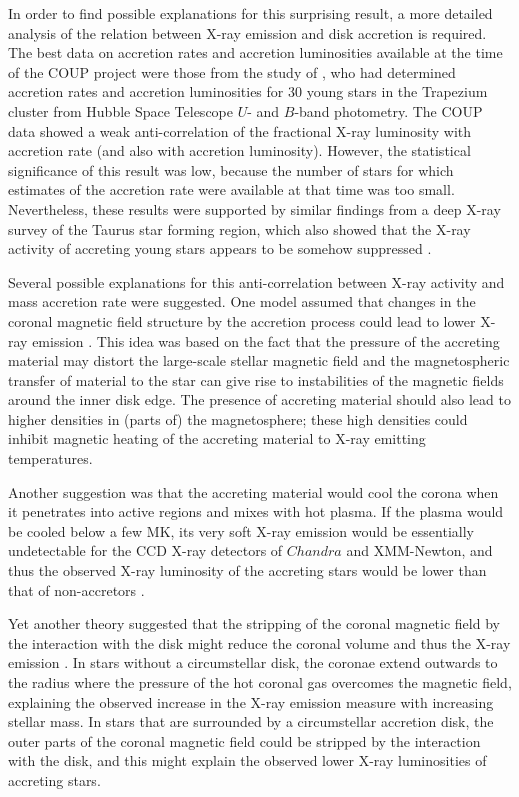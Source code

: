 \documentclass[10pt,fleqn,twoside,a4paper]{article}
\begin{document}
In order to find possible explanations for this surprising result, a more detailed
analysis of the relation between X-ray emission and disk accretion is required.
The best data on accretion rates and accretion luminosities
available at the time of the COUP project 
were those from the study of \citet{Robberto04},  who 
had determined
accretion rates and accretion luminosities for 30
young stars in the Trapezium cluster from Hubble Space Telescope $U$- and $B$-band photometry.
%
The COUP data showed  a weak anti-correlation of the fractional
X-ray luminosity with accretion rate (and also with accretion luminosity).
However,  the statistical significance of this result was low,
because the number of stars for which estimates of the 
accretion rate were available at that time was too small.
Nevertheless, these results were supported by similar findings from
a deep X-ray survey of the Taurus
star forming region, which  also showed   that
the X-ray activity of accreting young stars appears to be somehow suppressed \citep{Briggs07}.
\medskip



Several possible explanations for this  anti-correlation between X-ray activity 
and mass accretion rate were suggested.
One model assumed that changes in the coronal magnetic field
structure by the accretion process could lead to lower X-ray emission
\citep{Romanova04}. This idea was based on the fact that
the pressure of the accreting material may distort the large-scale
stellar magnetic field and
the magnetospheric transfer of material to the star can give rise to
instabilities of the magnetic fields around the inner disk edge.
The presence of accreting material should also lead to higher
densities in (parts of) the magnetosphere; these high densities
could inhibit magnetic heating of the
accreting material to X-ray emitting temperatures.

Another suggestion was that the  accreting material would cool the corona when it
penetrates into active regions and mixes with hot plasma.
If the plasma would be cooled below a few MK,
its very soft X-ray emission would be essentially undetectable for
the CCD X-ray detectors of $Chandra$ and XMM-Newton, and thus the
observed X-ray luminosity of the accreting stars would be lower
than that of non-accretors
\citep[see also][]{Telleschi07}.


Yet another theory suggested that the stripping of the coronal magnetic field 
by the interaction with the disk might reduce the coronal volume and thus the
X-ray emission \citep{Jardine06}.
In stars without a circumstellar disk,
the coronae extend outwards to the radius where the pressure of the
hot coronal gas overcomes the magnetic field,
explaining the observed increase in the X-ray emission measure
with increasing stellar mass.
In stars that are surrounded by a circumstellar accretion disk,
the outer parts of the coronal magnetic field could be stripped
by the interaction with the disk, and this might explain
the observed lower X-ray luminosities of accreting stars.
\end{document}
